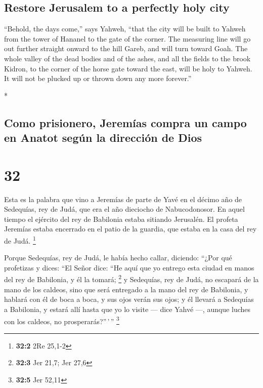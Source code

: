 \begin{paracol}{2}
\begin{otherlanguage}{english}
\hypertarget{restore-jerusalem-to-a-perfectly-holy-city}{%
\subsection{Restore Jerusalem to a perfectly holy
city}\label{restore-jerusalem-to-a-perfectly-holy-city}}

 ``Behold, the days come,'' says Yahweh, ``that the city
will be built to Yahweh from the tower of Hananel to the gate of the
corner.  The measuring line will go out further straight
onward to the hill Gareb, and will turn toward Goah.  The
whole valley of the dead bodies and of the ashes, and all the fields to
the brook Kidron, to the corner of the horse gate toward the east, will
be holy to Yahweh. It will not be plucked up or thrown down any more
forever.''

\end{otherlanguage}

\switchcolumn[0]*

\hypertarget{como-prisionero-jeremuxedas-compra-un-campo-en-anatot-seguxfan-la-direcciuxf3n-de-dios}{%
\subsection{Como prisionero, Jeremías compra un campo en Anatot según la
dirección de
Dios}\label{como-prisionero-jeremuxedas-compra-un-campo-en-anatot-seguxfan-la-direcciuxf3n-de-dios}}

\hypertarget{section-62}{%
\section{32}\label{section-62}}

 Esta es la palabra que vino a Jeremías de parte de Yavé
en el décimo año de Sedequías, rey de Judá, que era el año dieciocho de
Nabucodonosor.  En aquel tiempo el ejército del rey de
Babilonia estaba sitiando Jerusalén. El profeta Jeremías estaba
encerrado en el patio de la guardia, que estaba en la casa del rey de
Judá. \footnote{\textbf{32:2} 2Re 25,1-2}

 Porque Sedequías, rey de Judá, le había hecho callar,
diciendo: ``¿Por qué profetizas y dices: ``El Señor dice: ``He aquí que
yo entrego esta ciudad en manos del rey de Babilonia, y él la tomará;
\footnote{\textbf{32:3} Jer 21,7; Jer 27,6}  y Sedequías,
rey de Judá, no escapará de la mano de los caldeos, sino que será
entregado a la mano del rey de Babilonia, y hablará con él de boca a
boca, y sus ojos verán sus ojos;  y él llevará a Sedequías
a Babilonia, y estará allí hasta que yo lo visite --- dice Yahvé ---,
aunque luches con los caldeos, no prosperarás?''\,'\,'' \footnote{\textbf{32:5}
  Jer 52,11}


\end{paracol}
